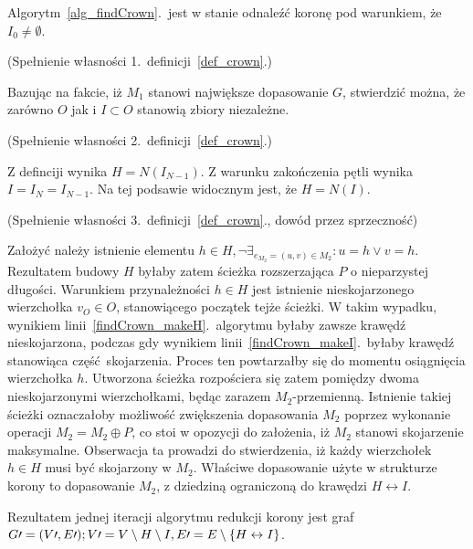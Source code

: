 \begin{theorem}
  Algorytm~\ref{alg_findCrown}.\ jest w stanie odnaleźć koronę pod warunkiem, że
  $I_0\neq\emptyset$.
\end{theorem}
\begin{bproof} (Spełnienie własności 1.\ definicji~\ref{def_crown}.)
  \par{
    Bazując na fakcie, iż $M_1$ stanowi największe dopasowanie $G$, stwierdzić
    można, że zarówno $O$ jak i $I \subset O$ stanowią zbiory niezależne.
  }
\end{bproof}
\begin{bproof} (Spełnienie własności 2.\ definicji~\ref{def_crown}.)
  \par{
    Z definciji wynika $H=N(I_{N-1})$.
    Z warunku zakończenia pętli wynika 
    $I=I_N=I_{N-1}$.
    Na tej podsawie widocznym jest, że $H=N(I)$.
  }
\end{bproof}
\begin{bproof} (Spełnienie własności 3.\ definicji~\ref{def_crown}., dowód przez
  sprzeczność)\par{
    Założyć należy istnienie elementu $h \in H, \neg\exists_{e_{M_2}=(u,v) \in
  M_2}: u=h \lor v = h$.
  Rezultatem budowy $H$ byłaby zatem ścieżka rozszerzająca $P$ o nieparzystej
  długości. 
  Warunkiem przynależności $h \in H$ jest istnienie nieskojarzonego wierzchołka
  $v_O \in O$, stanowiącego początek tejże ścieżki.
  W takim wypadku, wynikiem linii~\ref{findCrown_makeH}.\ algorytmu byłaby
  zawsze krawędź nieskojarzona, podczas gdy wynikiem
  linii~\ref{findCrown_makeI}.\ byłaby  krawędź stanowiąca część skojarzenia.
  Proces ten powtarzałby się do momentu osiągnięcia wierzchołka $h$.
  Utworzona ścieżka rozpościera się zatem pomiędzy dwoma nieskojarzonymi
  wierzchołkami, będąc zarazem $M_2$-przemienną.
  Istnienie takiej ścieżki oznaczałoby możliwość zwiększenia dopasowania $M_2$
  poprzez wykonanie operacji $M_2=M_2\oplus P$, co stoi w opozycji do
  założenia, iż $M_2$ stanowi skojarzenie maksymalne.
  Obserwacja ta prowadzi do stwierdzenia, iż każdy wierzchołek $h \in H$ musi
  być skojarzony w $M_2$.
  Właściwe dopasowanie użyte w strukturze korony to dopasowanie $M_2$, z
  dziedziną ograniczoną do krawędzi $H \leftrightarrow I$.
}
\end{bproof}

Rezultatem jednej iteracji algorytmu redukcji korony jest graf
$G\prime=(V\prime, E\prime);\\V\prime=V\setminus H \setminus I, E\prime = E
\setminus \{H\leftrightarrow I\}$.

